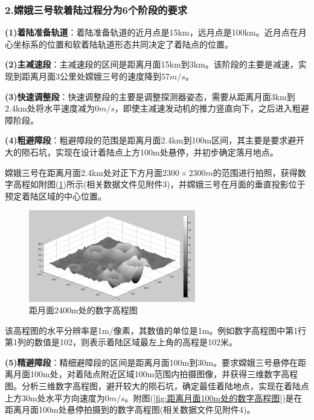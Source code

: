         \subsubsection{2.嫦娥三号软着陆过程分为6个阶段的要求}
            \par
            \textbf{(1)着陆准备轨道}：着陆准备轨道的近月点是15km，远月点是100km。近月点在月心坐标系的位置和软着陆轨道形态共同决定了着陆点的位置。
            \par
            \textbf{(2)主减速段}：主减速段的区间是距离月面15km到3km。该阶段的主要是减速，实现到距离月面3公里处嫦娥三号的速度降到$57m/s$。
            \par
            \textbf{(3)快速调整段}：快速调整段的主要是调整探测器姿态，需要从距离月面3km到 2.4km处将水平速度减为$0m/s$，即使主减速发动机的推力竖直向下，之后进入粗避障阶段。
            \par
            \textbf{(4)粗避障段}：粗避障段的范围是距离月面2.4km到100m区间，其主要是要求避开大的陨石坑，实现在设计着陆点上方100m处悬停，并初步确定落月地点。
            \par
            嫦娥三号在距离月面2.4km处对正下方月面$2300\times 2300m$的范围进行拍照，获得数字高程如附图(\ref{fig:距月面2400m处的数字高程图})所示(相关数据文件见附件3)，并嫦娥三号在月面的垂直投影位于预定着陆区域的中心位置。
            \begin{figure}[H]
            \centering
            \includegraphics[height=4cm]{images/2400m_number.jpg}
            \caption{距月面2400m处的数字高程图}
            \label{fig:距月面2400m处的数字高程图}
            \end{figure}
            \par
            该高程图的水平分辨率是1m/像素，其数值的单位是1m。例如数字高程图中第1行第1列的数值是102，则表示着陆区域最左上角的高程是102米。
            \par
            \textbf{(5)精避障段}：精细避障段的区间是距离月面100m到30m。要求嫦娥三号悬停在距离月面100m处，对着陆点附近区域100m范围内拍摄图像，并获得三维数字高程图。分析三维数字高程图，避开较大的陨石坑，确定最佳着陆地点，实现在着陆点上方30m处水平方向速度为$0m/s$。附图(\ref{fig:距离月面100m处的数字高程图})是在距离月面100m处悬停拍摄到的数字高程图(相关数据文件见附件4)。
